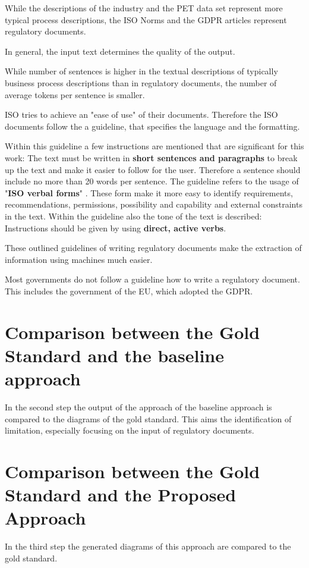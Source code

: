 While the descriptions of the industry and the PET data set represent more typical process descriptions, the ISO Norms and the GDPR articles represent regulatory documents. 

In general, the input text determines the quality of the output.

While number of sentences is higher in the textual descriptions of typically business process descriptions than in regulatory documents, the number of average tokens per sentence is smaller. 

ISO tries to achieve an "ease of use" \cite{ISOISOHouse} of their documents. Therefore the ISO documents follow the a guideline, that specifies the language and the formatting. 

Within this guideline a few instructions are mentioned that are significant for this work:
The text must be written in \textbf{short sentences and paragraphs} to break up the text and make it easier to follow for the user. Therefore a sentence should include no more than 20 words per sentence. The guideline refers to the usage of "\textbf{ISO verbal forms}" \cite{ISOISOHouse}. These form make it more easy to identify requirements, recommendations, permissions, possibility and capability and external constraints in the text. Within the guideline also the tone of the text is described: Instructions should be given by using \textbf{direct, active verbs}.

These outlined guidelines of writing regulatory documents make the extraction of information using machines much easier.

Most governments do not follow a guideline how to write a regulatory document. This includes the government of the EU, which adopted the GDPR. 



\newpage
\section{Comparison between the Gold Standard and the baseline approach}
In the second step the output of the approach of the baseline approach \cite{yuImprovedAutogenerationBusiness2023} is compared to the diagrams of the gold standard. This aims the identification of limitation, especially focusing on the input of regulatory documents.

\section{Comparison between the Gold Standard and the Proposed Approach}
In the third step the generated diagrams of this approach are compared to the gold standard.




